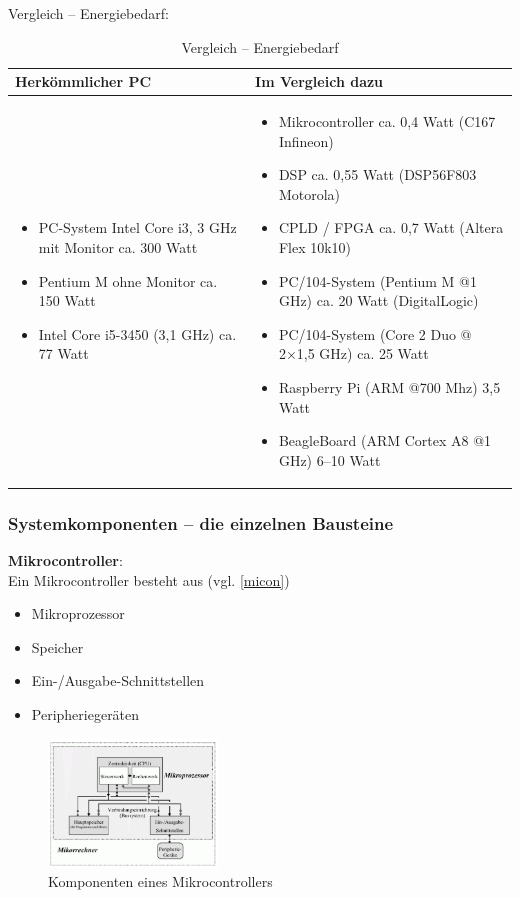 Vergleich – Energiebedarf:
\begin{table}[hbt]
\centering
\begin{tabular}{|p{5cm}|p{11cm}|}
\hline
\textbf{Herkömmlicher PC} & \textbf{Im Vergleich dazu} \\
\hline
\hline
\begin{itemize}
\item PC-System Intel Core i3, 3 GHz mit Monitor ca. 300 Watt
\item Pentium M ohne Monitor ca. 150 Watt
\item Intel Core i5-3450 (3,1 GHz) ca. 77 Watt
\end{itemize} &
\begin{itemize}
\item Mikrocontroller ca. 0,4 Watt (C167 Infineon)
\item DSP ca. 0,55 Watt (DSP56F803 Motorola)
\item CPLD / FPGA ca. 0,7 Watt (Altera Flex 10k10)
\item PC/104-System (Pentium M @1 GHz) ca. 20 Watt (DigitalLogic)
\item PC/104-System (Core 2 Duo @ 2×1,5 GHz) ca. 25 Watt
\item Raspberry Pi (ARM @700 Mhz) 3,5 Watt
\item BeagleBoard (ARM Cortex A8 @1 GHz) 6–10 Watt
\end{itemize}\\
\hline
\end{tabular}
\caption{Vergleich – Energiebedarf}
\label{tab:energie}
\end{table}
\subsubsection{Systemkomponenten – die einzelnen Bausteine}
\textbf{Mikrocontroller}:\\ Ein Mikrocontroller besteht aus (vgl. \autoref{micon})
\begin{itemize}
\item Mikroprozessor
\item Speicher
\item Ein-/Ausgabe-Schnittstellen
\item Peripheriegeräten
\end{itemize}
\begin{figure}[h!]
	\centering
	\includegraphics[width=0.4\textwidth]{figures/ch07_microcon.png}
	\caption{Komponenten eines Mikrocontrollers}
	\label{micon}
\end{figure}

